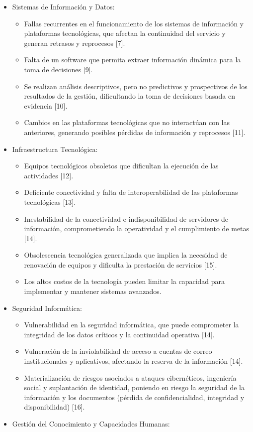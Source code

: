 \documentclass[
	a4paper, %
	12pt, %
]{include/CSSullivanBusinessReport}
\def\tightlist{}
\begin{document}
\begin{itemize}
\tightlist
\item
  Sistemas de Información y Datos:

  \begin{itemize}
  \tightlist
  \item
    Fallas recurrentes en el funcionamiento de los sistemas de
    información y plataformas tecnológicas, que afectan la continuidad
    del servicio y generan retrasos y reprocesos {[}7{]}.
  \item
    Falta de un software que permita extraer información dinámica para
    la toma de decisiones {[}9{]}.
  \item
    Se realizan análisis descriptivos, pero no predictivos y
    prospectivos de los resultados de la gestión, dificultando la toma
    de decisiones basada en evidencia {[}10{]}.
  \item
    Cambios en las plataformas tecnológicas que no interactúan con las
    anteriores, generando posibles pérdidas de información y reprocesos
    {[}11{]}.
  \end{itemize}
\item
  Infraestructura Tecnológica:

  \begin{itemize}
  \tightlist
  \item
    Equipos tecnológicos obsoletos que dificultan la ejecución de las
    actividades {[}12{]}.
  \item
    Deficiente conectividad y falta de interoperabilidad de las
    plataformas tecnológicas {[}13{]}.
  \item
    Inestabilidad de la conectividad e indisponibilidad de servidores de
    información, comprometiendo la operatividad y el cumplimiento de
    metas {[}14{]}.
  \item
    Obsolescencia tecnológica generalizada que implica la necesidad de
    renovación de equipos y dificulta la prestación de servicios
    {[}15{]}.
  \item
    Los altos costos de la tecnología pueden limitar la capacidad para
    implementar y mantener sistemas avanzados.
  \end{itemize}
\item
  Seguridad Informática:

  \begin{itemize}
  \tightlist
  \item
    Vulnerabilidad en la seguridad informática, que puede comprometer la
    integridad de los datos críticos y la continuidad operativa
    {[}14{]}.
  \item
    Vulneración de la inviolabilidad de acceso a cuentas de correo
    institucionales y aplicativos, afectando la reserva de la
    información {[}14{]}.
  \item
    Materialización de riesgos asociados a ataques cibernéticos,
    ingeniería social y suplantación de identidad, poniendo en riesgo la
    seguridad de la información y los documentos (pérdida de
    confidencialidad, integridad y disponibilidad) {[}16{]}.
  \end{itemize}
\item
  Gestión del Conocimiento y Capacidades Humanas:


\end{itemize}
\end{document}
